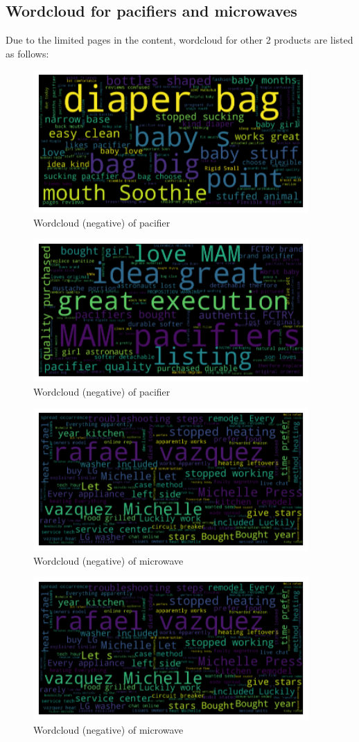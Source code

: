 \documentclass{mcmthesis}
\begin{document}
\begin{appendices}
\subsection{Wordcloud for pacifiers and microwaves}
Due to the limited pages in the content, wordcloud for other 2 products are listed as follows:
\begin{figure}[htbp]
\centering
\includegraphics[width=10.5cm]{./figures/pacifier_good.png}
\caption{Wordcloud (negative) of pacifier}
\end{figure}
\begin{figure}[htbp]
\centering
\includegraphics[width=10.5cm]{./figures/pacifier_bad.png}
\caption{Wordcloud (negative) of pacifier}
\end{figure}
\begin{figure}[htbp]
\centering
\includegraphics[width=10.5cm]{./figures/microwave_bad.png}
\caption{Wordcloud (negative) of microwave}
\end{figure}
\begin{figure}[htbp]
\centering
\includegraphics[width=10.5cm]{./figures/microwave_bad.png}
\caption{Wordcloud (negative) of microwave}
\end{figure}
\end{appendices}
\end{document}
